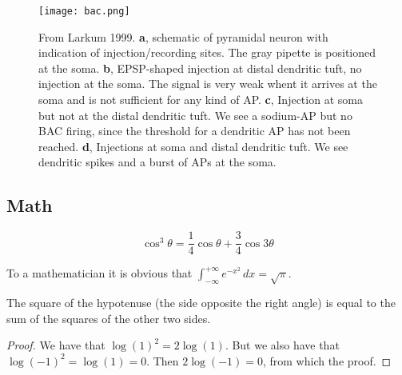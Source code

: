 \documentclass[
10pt, %
a4paper, %
oneside, %
headinclude,footinclude, %
BCOR5mm, %
]{scrartcl}
\begin{document}
\begin{figure}[tb]
\centering 
\texttt{[image: bac.png]} 
\caption[BAC Firing]{From Larkum 1999. \textbf{a}, schematic of pyramidal neuron with indication of injection/recording sites. The gray pipette is positioned at the soma. \textbf{b}, EPSP-shaped injection at distal dendritic tuft, no injection at the soma. The signal is very weak whent it arrives at the soma and is not sufficient for any kind of AP. \textbf{c}, Injection at soma but not at the distal dendritic tuft. We see a sodium-AP but no BAC firing, since the threshold for a dendritic AP has not been reached. \textbf{d},  Injections at soma and distal dendritic tuft. We see dendritic spikes and a burst of APs at the soma.} %
\label{fig:gallery} 
\end{figure}


\subsection{Math}

\lipsum[4] %

\begin{equation}
\cos^3 \theta =\frac{1}{4}\cos\theta+\frac{3}{4}\cos 3\theta
\label{eq:refname2}
\end{equation}

\lipsum[5] %

\begin{definition}[Gauss] 
To a mathematician it is obvious that
$\int_{-\infty}^{+\infty}
e^{-x^2}\,dx=\sqrt{\pi}$. 
\end{definition} 

\begin{theorem}[Pythagoras]
The square of the hypotenuse (the side opposite the right angle) is equal to the sum of the squares of the other two sides.
\end{theorem}

\begin{proof} 
We have that $\log(1)^2 = 2\log(1)$.
But we also have that $\log(-1)^2=\log(1)=0$.
Then $2\log(-1)=0$, from which the proof.
\end{proof}

\end{document}

